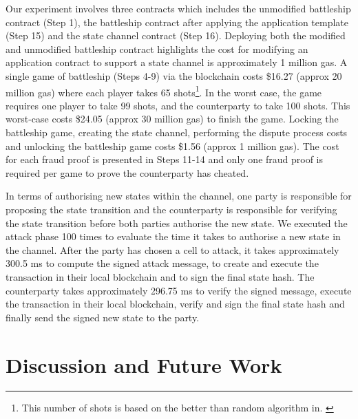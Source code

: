 \documentclass{llncs}
\newcommand{\battleshipbegin}{\mathsf{BS.begingame}}
\begin{document}
	Our experiment involves three contracts which includes the unmodified battleship contract (Step 1), the battleship contract after applying the application template (Step 15) and the state channel contract (Step 16). 
	Deploying both the modified and unmodified battleship contract highlights the cost for modifying an application contract to support a state channel is approximately 1 million gas. 
	A single game of battleship (Steps 4-9) via the blockchain costs \$16.27 (approx 20 million gas) where each player takes 65 shots\footnote{This number of shots is based on the better than random algorithm in. \cite{battleshipdata}}.
	In the worst case, the game requires one player to take 99 shots, and the counterparty to take 100 shots. 
	This worst-case costs \$24.05 (approx 30 million gas) to finish the game.  
	Locking the battleship game, creating the state channel, performing the dispute process costs and unlocking the battleship game costs \$1.56 (approx 1 million gas). 
	The cost for each fraud proof is presented in Steps 11-14 and only one fraud proof is required per game to prove the counterparty has cheated. 
	
	In terms of authorising new states within the channel, one party is responsible for proposing the state transition and the counterparty is responsible for verifying the state transition before both parties authorise the new state. 
	We executed the attack phase 100 times to evaluate the time it takes to authorise a new state in the channel. 
	After the party has chosen a cell to attack, it takes approximately 300.5 ms to compute the signed attack message, to create and execute the transaction in their local blockchain and to sign the final state hash. 
	The counterparty takes approximately 296.75 ms to verify the signed message, execute the transaction in their local blockchain, verify and sign the final state hash and finally send the signed new state to the party. 
	
	
	\section{Discussion and Future Work} 
	
	
	
\end{document}
